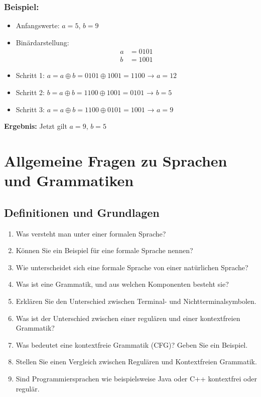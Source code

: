 \documentclass{article}
\begin{document}
\subsubsection*{Beispiel:}
\begin{itemize}
	\item Anfangswerte: \( a = 5 \), \( b = 9 \)
	\item Binärdarstellung:
	\[
	\begin{aligned}
		a &= 0101 \\
		b &= 1001
	\end{aligned}
	\]
	\item Schritt 1: \( a = a \oplus b = 0101 \oplus 1001 = 1100 \) → \( a = 12 \)
	\item Schritt 2: \( b = a \oplus b = 1100 \oplus 1001 = 0101 \) → \( b = 5 \)
	\item Schritt 3: \( a = a \oplus b = 1100 \oplus 0101 = 1001 \) → \( a = 9 \)
\end{itemize}

\textbf{Ergebnis:} Jetzt gilt \( a = 9 \), \( b = 5 \)


	
	
	\section{Allgemeine Fragen zu Sprachen und Grammatiken}

\subsection*{Definitionen und Grundlagen}
\begin{enumerate}
	\item Was versteht man unter einer formalen Sprache?
	\item Können Sie ein Beispiel für eine formale Sprache nennen?
	\item Wie unterscheidet sich eine formale Sprache von einer natürlichen Sprache?
	\item Was ist eine Grammatik, und aus welchen Komponenten besteht sie?
	\item Erklären Sie den Unterschied zwischen Terminal- und Nichtterminalsymbolen.
	\item Was ist der Unterschied zwischen einer regulären und einer kontextfreien Grammatik?
	\item Was bedeutet eine \glqq kontextfreie Grammatik\grqq{} (CFG)? Geben Sie ein Beispiel.
	\item Stellen Sie einen Vergleich zwischen Regulären  und Kontextfreien Grammatik.
	\item Sind Programmiersprachen wie beispielsweise Java oder C++ kontextfrei oder regulär.
\end{enumerate}
\end{document}

